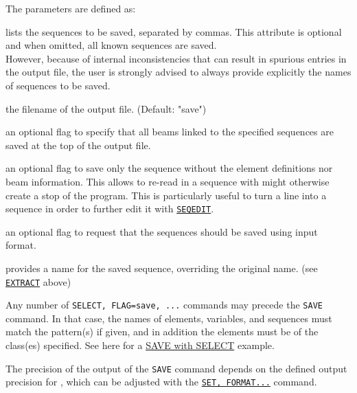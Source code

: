 The parameters are defined as: 
\begin{madlist}
	 lists the sequences to be saved, separated by commas. 
	This attribute is optional and when omitted, all known 
	sequences are saved. \\
	However, because of internal inconsistencies that can result in spurious 
	entries in the output file, the user is strongly advised to always provide 
	explicitly the names of sequences to be saved.
	
	 the filename of the output file. (Default: "save")
	
	 an optional flag to specify that all beams linked to the
	specified sequences are saved at the top of the output file.
	
	 an optional flag to save only the sequence without the
	element definitions nor beam information. This allows to re-read in a
	sequence with might otherwise create a stop of the program. This is
	particularly useful to turn a line into a sequence in order to further edit 
	it with \hyperref[sec:seqedit]{\tt SEQEDIT}.
	
	 an optional flag to request that the sequences should be  
	saved using \madeight input format.  
	
	 provides a name for the saved sequence, overriding the 
	original name. (see \hyperref[sec:extract]{\tt EXTRACT} above)
\end{madlist}


Any number of {\tt SELECT, FLAG=save, ...} commands may precede
the {\tt SAVE} command. In that case, the names of elements, variables, and
sequences must match the pattern(s) if given, and in addition the
elements must be of the class(es) specified. 
See here for a
\href{../Introduction/select.html#save_select}{SAVE with SELECT}
example.  

The precision of the output of the {\tt SAVE} command depends on the defined 
output precision for \madx, which can be adjusted with the 
\hyperref[sec:set]{\tt SET, FORMAT...} command.

 


